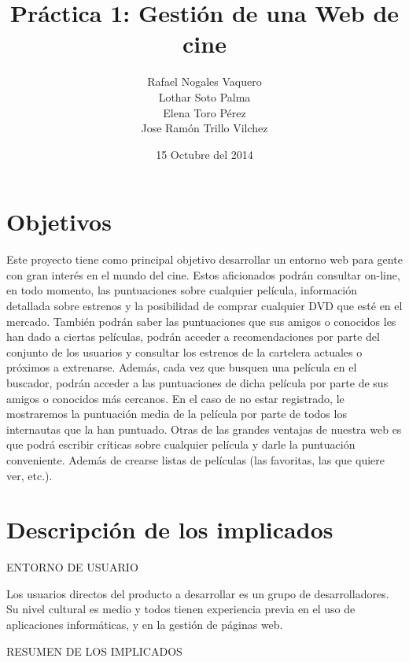 \documentclass{article}
\title{Práctica 1: Gestión de una Web de cine}
\author{Rafael Nogales Vaquero
\\Lothar Soto Palma
\\Elena Toro Pérez
\\Jose Ramón Trillo Vilchez}
\date{15 Octubre del 2014}
\begin{document}
\maketitle

\section{Objetivos}
Este proyecto tiene como principal objetivo desarrollar un entorno web para gente con gran interés en el mundo del cine.
Estos aficionados podrán consultar on-line, en todo momento, las puntuaciones sobre cualquier película, información
detallada sobre estrenos y la posibilidad de comprar cualquier DVD que esté en el mercado.
También podrán saber las puntuaciones que sus amigos o conocidos les han dado a ciertas películas, podrán acceder a
recomendaciones por parte del conjunto de los usuarios y consultar los estrenos de la cartelera actuales o próximos a
extrenarse.
Además, cada vez que busquen una película en el buscador, podrán acceder a las puntuaciones de dicha película por parte de
sus amigos o conocidos más cercanos.
En el caso de no estar registrado, le mostraremos la puntuación media de la película
por parte de todos los internautas que la han puntuado.
Otras de las grandes ventajas de nuestra web es que podrá escribir críticas sobre cualquier película y darle la puntuación
conveniente. Además de crearse listas de películas (las favoritas, las que quiere ver, etc.).
\section{Descripción de los implicados}
ENTORNO DE USUARIO
\begin{description}
\item Los usuarios directos del producto a desarrollar es un grupo de desarrolladores. Su nivel cultural es medio y todos tienen experiencia previa en el uso de aplicaciones informáticas, y en la gestión de páginas web.
\end{description}
\vspace{3cm}
RESUMEN DE LOS IMPLICADOS
\end{document}
